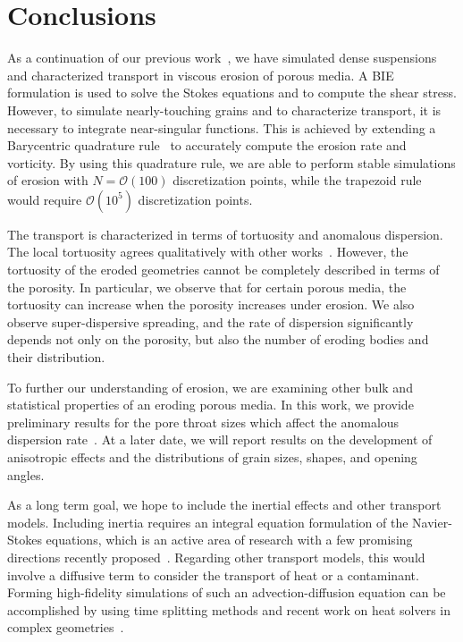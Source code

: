 \documentclass{jfm}
\begin{document}
\section{Conclusions}
\label{sec:conclusions}
As a continuation of our previous work~\citep{qua-moo2018}, we have
simulated dense suspensions and characterized transport in viscous
erosion of porous media. A BIE formulation is used to solve the Stokes
equations and to compute the shear stress. However, to simulate
nearly-touching grains and to characterize transport, it is necessary to
integrate near-singular functions. This is achieved by extending a
Barycentric quadrature rule~\citep{bar-wu-vee2015} to accurately compute
the erosion rate and vorticity. By using this quadrature rule, we are
able to perform stable simulations of erosion with $N =
\mathcal{O}(100)$ discretization points, while the trapezoid rule would
require $\mathcal{O}(10^5)$ discretization points.

The transport is characterized in terms of tortuosity and anomalous
dispersion. The local tortuosity agrees qualitatively with other
works~\citep{mat-kha-koz2008}. However, the tortuosity of the eroded
geometries cannot be completely described in terms of the porosity. In
particular, we observe that for certain porous media, the tortuosity can
increase when the porosity increases under erosion. We also observe
super-dispersive spreading, and the rate of dispersion significantly
depends not only on the porosity, but also the number of eroding bodies
and their distribution.

To further our understanding of erosion, we are examining other bulk and
statistical properties of an eroding porous media. In this work, we
provide preliminary results for the pore throat sizes which affect the
anomalous dispersion rate~\citep{dea-qua-bir-jua2018}.  At a later date,
we will report results on the  development of anisotropic effects and
the distributions of grain sizes, shapes, and opening angles.

As a long term goal, we hope to include the inertial effects and other
transport models. Including inertia requires an integral equation
formulation of the Navier-Stokes equations, which is an active area of
research with a few promising directions recently
proposed~\citep{gray2019boundary, kli-ask-kro2019}.  Regarding other
transport models, this would involve a diffusive term to consider the
transport of heat or a contaminant. Forming high-fidelity simulations of
such an advection-diffusion equation can be accomplished by using time
splitting methods and recent work on heat solvers in complex
geometries~\citep{fry-kro-tor2019}.
\end{document}
